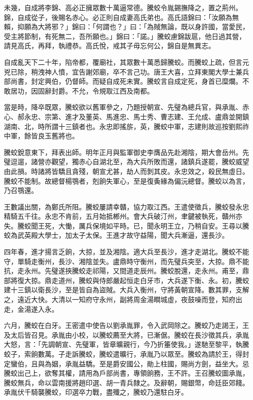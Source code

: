 \begin{pinyinscope}
未幾，自成將李錦、高必正擁眾數十萬逼常德。騰蛟令胤錫撫降之，置之荊州。錦，自成從子，後賜名赤心。必正則自成妻高氏弟也。高氏語錦曰：「汝願為無賴，抑願為大將邪？」錦曰：「何謂也？」曰：「為賊無論，既以身許國，當愛民，受主將節制，有死無二，吾所願也。」錦曰：「諾。」騰蛟慮錦跋扈，他日過其營，請見高氏，再拜，執禮恭。高氏悅，戒其子毋忘何公，錦自是無異志。

自成亂天下二十年，陷帝都，覆廟社，其眾數十萬悉歸騰蛟。而騰蛟上疏，但言元兇已除，稍洩神人憤，宜告謝郊廟，卒不言己功。唐王大喜，立拜東閣大學士兼兵部尚書，封定興伯，仍督師。而疑自成死未實。騰蛟言自成定死，身首已糜爛。不敢居功，因固辭封爵。不允，令規取江西及南都。

當是時，降卒既眾，騰蛟欲以舊軍參之，乃題授朝宣、先璧為總兵官，與承胤、赤心、郝永忠、宗第、進才及董英、馬進忠、馬士秀、曹志建、王允成、盧鼎並開鎮湖南、北，時所謂十三鎮者也。永忠即搖旂，英，騰蛟中軍，志建則故巡按劉熙祚中軍，餘皆良玉舊將也。

騰蛟銳意東下，拜表出師。明年正月與監軍御史李膺品先赴湘陰，期大會岳州。先璧逗遛，諸營亦觀望，獨赤心自湖北至，為大兵所敗而還，諸鎮兵遂罷，騰蛟威望由此損。時諸將皆驕且貪殘，朝宣尤甚，劫人而剝其皮。永忠效之，殺民無虛日。騰蛟不能制。故總督楊鶚者，剋餉失軍心，至是復夤緣為偏沅總督。騰蛟以為言，乃召鶚還。

王數議出關，為鄭氏所阻。騰蛟屢請幸贛，協力取江西。王遣使徵兵，騰蛟發永忠精騎五千往。永忠不肯前，五月始抵郴州。會大兵破汀州，聿鍵被執死，贛州亦失。騰蛟聞王死，大慟，厲兵保境如平時。已，聞永明王立，乃稍自安。王尋以騰蛟為武英殿大學士，加太子太保。王進才故守益陽，聞大兵漸逼，還長沙。

四年春，進才揚言乏餉，大掠，並及湘陰。適大兵至長沙，進才走湖北。騰蛟不能守，單騎走衡州，長沙、湘陰並失。盧鼎時守衡州，而先璧兵突至，大掠。鼎不能抗，走永州。先璧遂挾騰蛟走祁陽，又間道走辰州。騰蛟脫還，走永州。甫至，鼎部將復大掠。鼎走道州，騰蛟與侍郎嚴起恒走白牙市，大兵遂下衡、永。初，騰蛟建十三鎮以衛長沙，至是皆自為盜賊。大兵入衡州，守將黃朝宣降。數其罪，支解之，遠近大快。大清以一知府守永州，副將周金湯瞷城虛，夜鼓噪而登，知府出走，金湯遂入永。

六月，騰蛟在白牙。王密遣中使告以劉承胤罪，令入武岡除之。騰蛟乃走謁王，王及太后皆召見。承胤由小校，以騰蛟薦至大將，已漸倨。騰蛟在長沙徵其兵，承胤大怒，言：「先調朝宣、先璧軍，皆章曠親行，今乃折箠使我。」遂馳至黎平，執騰蛟子，索餉數萬。子走訴騰蛟，騰蛟遣曠行，承胤乃以眾至。騰蛟為請於王，得封定蠻伯，且與為姻，承胤益驕。至是爵安國公，勛上柱國，賜尚方劍，益坐大。忌騰蛟出己上，欲奪其權，請用為戶部尚書，專領餉務，王不許。王召騰蛟圖承胤，騰蛟無兵，命以雲南援將趙印選、胡一青兵隸之。及辭朝，賜銀幣，命廷臣郊餞。承胤伏千騎襲騰蛟，印選卒力戰，盡殲之，騰蛟乃還駐白牙。


\end{pinyinscope}
